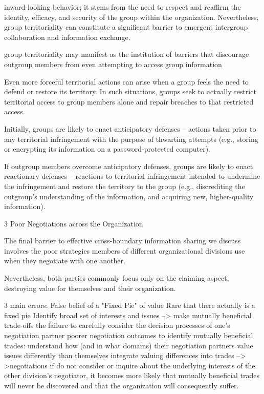 inward-looking behavior; it stems from the need to respect and reaffirm the identity, efficacy, and security of the group within the organization. Nevertheless, group territoriality can constitute a significant barrier to emergent intergroup collaboration and information exchange.

group territoriality may manifest as the institution of barriers that discourage outgroup members from even attempting to access group information

Even more forceful territorial actions can arise when a group feels the need to defend or restore its territory.  In such situations, groups seek to actually restrict territorial  access to group members alone and repair breaches to that restricted access.

Initially, groups are likely to enact anticipatory defenses – actions taken prior to any territorial infringement with the purpose of thwarting attempts (e.g., storing or encrypting its information on a password-protected computer). 

If outgroup members overcome anticipatory defenses, groups are  likely to enact reactionary defenses – reactions to territorial infringement intended to undermine the infringement and restore the territory to the group (e.g., discrediting the outgroup’s understanding of the information, and acquiring new, higher-quality information).




    3 Poor Negotiations across the Organization
    
The final barrier to effective cross-boundary information sharing we discuss involves the poor strategies members of different organizational divisions use when they negotiate with one another.

Nevertheless, both parties commonly focus only on the claiming aspect, destroying value for themselves and their organization.

3 main errors:
    False belief of a "Fixed Pie" of value
        Rare that there actually is a fixed pie
        Identify broad set of interests and issues --> make mutually beneficial trade-offs
    the failure to carefully consider the decision processes of one’s negotiation partner
        poorer negotiation outcomes
        to identify mutually beneficial trades:
            understand how (and in what domains) their negotiation partners value issues differently than themselves
            integrate valuing differences into trades --> >negotiations
            if do not consider or inquire about the underlying interests of the other division’s negotiator, it becomes more likely that mutually beneficial trades will never be discovered
                and that the organization will consequently suffer.

